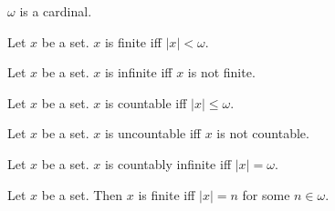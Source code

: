 \documentclass[10pt]{article}
\begin{document}
  \begin{forthel}
    \begin{corollary}
      $\omega$ is a cardinal.
    \end{corollary}
  \end{forthel}

  \begin{forthel}
    \begin{definition}
      Let $x$ be a set.
      $x$ is finite iff $|x| < \omega$.
    \end{definition}
  \end{forthel}

  \begin{forthel}
    \begin{definition}
      Let $x$ be a set.
      $x$ is infinite iff $x$ is not finite.
    \end{definition}
  \end{forthel}

  \begin{forthel}
    \begin{definition}
      Let $x$ be a set.
      $x$ is countable iff $|x| \leq \omega$.
    \end{definition}
  \end{forthel}

  \begin{forthel}
    \begin{definition}
      Let $x$ be a set.
      $x$ is uncountable iff $x$ is not countable.
    \end{definition}
  \end{forthel}

  \begin{forthel}
    \begin{definition}
      Let $x$ be a set.
      $x$ is countably infinite iff $|x| = \omega$.
    \end{definition}
  \end{forthel}

  \begin{forthel}
    \begin{proposition}
      Let $x$ be a set.
      Then $x$ is finite iff $|x| = n$ for some $n \in \omega$.
    \end{proposition}
  \end{forthel}
\end{document}
